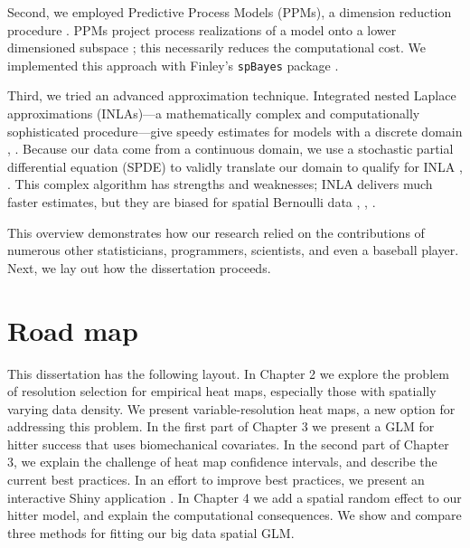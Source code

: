 Second, we employed Predictive Process Models (PPMs), a dimension reduction procedure \citep{Finley2012}. PPMs project process realizations of a model onto a lower dimensioned subspace \citep{Banerjee2008}; this necessarily reduces the computational cost. We implemented this approach with Finley's \verb|spBayes| package \citep{Finley2013}.

Third, we tried an advanced approximation technique. Integrated nested Laplace approximations (INLAs)---a mathematically complex and computationally sophisticated procedure---give speedy estimates for models with a discrete domain \citep{Rue2009}, \citep{Rue2005}. Because our data come from a continuous domain, we use a stochastic partial differential equation (SPDE) to validly translate our domain to qualify for INLA \citep{Lindgren2011}, \citep{Lindstrom2016}. This complex algorithm has strengths and weaknesses; INLA delivers much faster estimates, but they are biased for spatial Bernoulli data \citep{Mondal2017}, \citep{Simpson2012b}, \citep{Rue2009}.

This overview demonstrates how our research relied on the contributions of numerous other statisticians, programmers, scientists, and even a baseball player. Next, we lay out how the dissertation proceeds.

\section{Road map}

This dissertation has the following layout. In Chapter 2 we explore the problem of resolution selection for empirical heat maps, especially those with spatially varying data density. We present variable-resolution heat maps, a new option for addressing this problem. In the first part of Chapter 3 we present a GLM for hitter success that uses biomechanical covariates. In the second part of Chapter 3, we explain the challenge of heat map confidence intervals, and describe the current best practices. In an effort to improve best practices, we present an interactive Shiny application \citep{Shiny}. In Chapter 4 we add a spatial random effect to our hitter model, and explain the computational consequences. We show and compare three methods for fitting our big data spatial GLM. 
